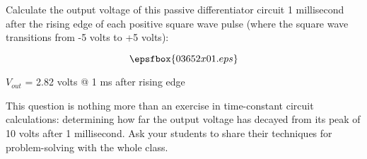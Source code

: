 

Calculate the output voltage of this passive differentiator circuit 1 millisecond after the rising edge of each positive square wave pulse (where the square wave transitions from -5 volts to +5 volts):

$$\epsfbox{03652x01.eps}$$







$V_{out}$ = 2.82 volts @ 1 ms after rising edge







This question is nothing more than an exercise in time-constant circuit calculations: determining how far the output voltage has decayed from its peak of 10 volts after 1 millisecond.  Ask your students to share their techniques for problem-solving with the whole class.




